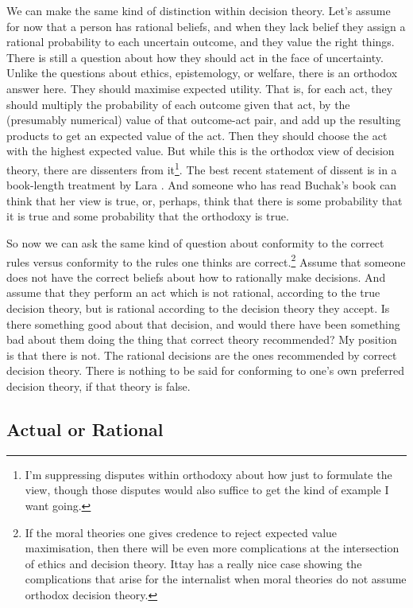 We can make the same kind of distinction within decision theory. Let's assume for now that a person has rational beliefs, and when they lack belief they assign a rational probability to each uncertain outcome, and they value the right things. There is still a question about how they should act in the face of uncertainty. Unlike the questions about ethics, epistemology, or welfare, there is an orthodox answer here. They should maximise expected utility. That is, for each act, they should multiply the probability of each outcome given that act, by the (presumably numerical) value of that outcome-act pair, and add up the resulting products to get an expected value of the act. Then they should choose the act with the highest expected value. But while this is the orthodox view of decision theory, there are dissenters from it\footnote{I'm suppressing disputes within orthodoxy about how just to formulate the view, though those disputes would also suffice to get the kind of example I want going.}. The best recent statement of dissent is in a book-length treatment by Lara \citet{BuchakRisk}. And someone who has read Buchak's book can think that her view is true, or, perhaps, think that there is some probability that it is true and some probability that the orthodoxy is true.

So now we can ask the same kind of question about conformity to the correct rules versus conformity to the rules one thinks are correct.\footnote{If the moral theories one gives credence to reject expected value maximisation, then there will be even more complications at the intersection of ethics and decision theory. Ittay \citet{NissanRozen2015} has a really nice case showing the complications that arise for the internalist when moral theories do not assume orthodox decision theory.} Assume that someone does not have the correct beliefs about how to rationally make decisions. And assume that they perform an act which is not rational, according to the true decision theory, but is rational according to the decision theory they accept. Is there something good about that decision, and would there have been something bad about them doing the thing that correct theory recommended? My position is that there is not. The rational decisions are the ones recommended by correct decision theory. There is nothing to be said for conforming to one's own preferred decision theory, if that theory is false.

\subsection{Actual or Rational}
\label{actualorrational}

